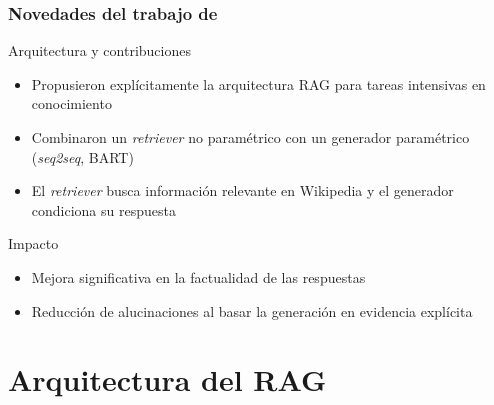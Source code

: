 \documentclass[handout]{beamer}
\begin{document}
\begin{frame}
  \frametitle{Novedades del trabajo de \textcite{Lewis2020RAG}}
  \begin{block}{Arquitectura y contribuciones}
    \begin{itemize}
      \item Propusieron explícitamente la arquitectura RAG para tareas intensivas en conocimiento
      \item Combinaron un \textit{retriever} no paramétrico con un generador paramétrico (\textit{seq2seq}, BART)
      \item El \textit{retriever} busca información relevante en Wikipedia y el generador condiciona su respuesta
    \end{itemize}
  \end{block}
  \begin{alertblock}{Impacto}
    \begin{itemize}
        \item Mejora significativa en la factualidad de las respuestas
        \item Reducción de alucinaciones al basar la generación en evidencia explícita
    \end{itemize}
  \end{alertblock}
\end{frame}

\section{Arquitectura del RAG}
\end{document}
